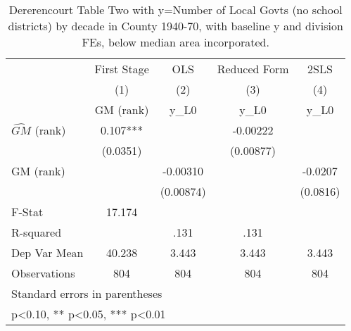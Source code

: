\begin{table}[htbp]\centering
\def\sym#1{\ifmmode^{#1}\else\(^{#1}\)\fi}
\caption{Dererencourt Table Two with y=Number of Local Govts (no school districts) by decade in County 1940-70, with baseline y and division FEs, below median area incorporated.}
\begin{tabular}{l*{4}{c}}
\toprule
                    & First Stage   &         OLS   &Reduced Form   &        2SLS   \\
                    &\multicolumn{1}{c}{(1)}&\multicolumn{1}{c}{(2)}&\multicolumn{1}{c}{(3)}&\multicolumn{1}{c}{(4)}\\
                    &\multicolumn{1}{c}{GM  (rank)}&\multicolumn{1}{c}{y\_L0}&\multicolumn{1}{c}{y\_L0}&\multicolumn{1}{c}{y\_L0}\\
\midrule
$\hat{GM}$ (rank)   &       0.107***&               &    -0.00222   &               \\
                    &    (0.0351)   &               &   (0.00877)   &               \\
\addlinespace
GM  (rank)          &               &    -0.00310   &               &     -0.0207   \\
                    &               &   (0.00874)   &               &    (0.0816)   \\
\midrule
F-Stat              &      17.174   &               &               &               \\
R-squared           &               &        .131   &        .131   &               \\
Dep Var Mean        &      40.238   &       3.443   &       3.443   &       3.443   \\
Observations        &         804   &         804   &         804   &         804   \\
\bottomrule
\multicolumn{5}{l}{\footnotesize Standard errors in parentheses}\\
\multicolumn{5}{l}{\footnotesize * p<0.10, ** p<0.05, *** p<0.01}\\
\end{tabular}
\end{table}
